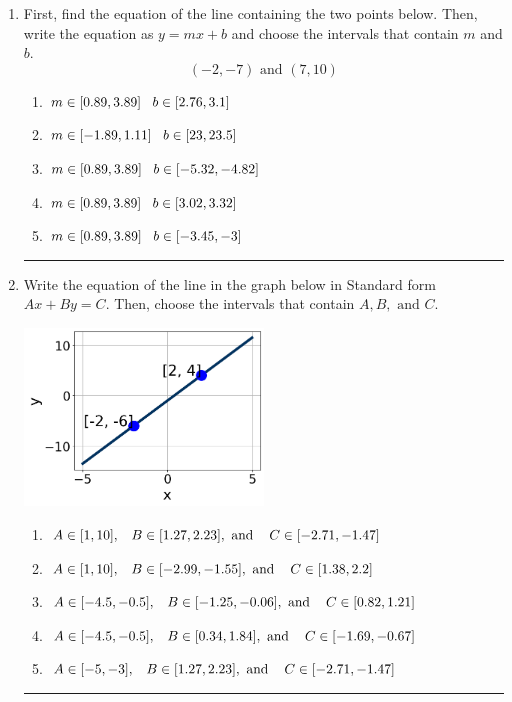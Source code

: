 \documentclass[14pt]{extbook}
\newcommand{\litem}[1]{\item#1\hspace*{-1cm}\rule{\textwidth}{0.4pt}}
\begin{document}
\begin{enumerate}
\litem{
First, find the equation of the line containing the two points below. Then, write the equation as $ y=mx+b $ and choose the intervals that contain $m$ and $b$.\[ (-2, -7) \text{ and } (7, 10) \]\begin{enumerate}[label=\Alph*.]
\item \( m \in [0.89, 3.89] \hspace*{3mm} b \in [2.76, 3.1] \)
\item \( m \in [-1.89, 1.11] \hspace*{3mm} b \in [23, 23.5] \)
\item \( m \in [0.89, 3.89] \hspace*{3mm} b \in [-5.32, -4.82] \)
\item \( m \in [0.89, 3.89] \hspace*{3mm} b \in [3.02, 3.32] \)
\item \( m \in [0.89, 3.89] \hspace*{3mm} b \in [-3.45, -3] \)

\end{enumerate} }
\litem{
Write the equation of the line in the graph below in Standard form $Ax+By=C$. Then, choose the intervals that contain $A, B, \text{ and } C$.
\begin{center}
    \includegraphics[width=0.5\textwidth]{../Figures/linearGraphToStandardCopyC.png}
\end{center}
\begin{enumerate}[label=\Alph*.]
\item \( A \in [1, 10], \hspace{3mm} B \in [1.27, 2.23], \text{ and } \hspace{3mm} C \in [-2.71, -1.47] \)
\item \( A \in [1, 10], \hspace{3mm} B \in [-2.99, -1.55], \text{ and } \hspace{3mm} C \in [1.38, 2.2] \)
\item \( A \in [-4.5, -0.5], \hspace{3mm} B \in [-1.25, -0.06], \text{ and } \hspace{3mm} C \in [0.82, 1.21] \)
\item \( A \in [-4.5, -0.5], \hspace{3mm} B \in [0.34, 1.84], \text{ and } \hspace{3mm} C \in [-1.69, -0.67] \)
\item \( A \in [-5, -3], \hspace{3mm} B \in [1.27, 2.23], \text{ and } \hspace{3mm} C \in [-2.71, -1.47] \)


\end{enumerate}}
\end{enumerate}
\end{document}

